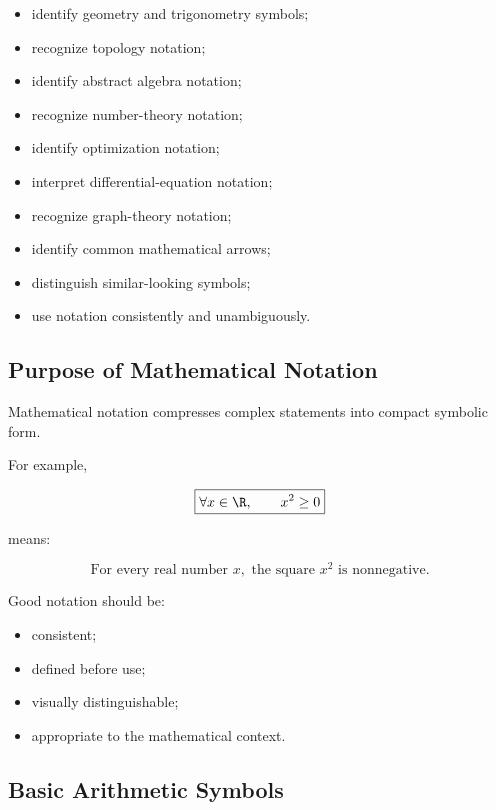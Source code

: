 {\begin{itemize}
    \item identify geometry and trigonometry symbols;
    \item recognize topology notation;
    \item identify abstract algebra notation;
    \item recognize number-theory notation;
    \item identify optimization notation;
    \item interpret differential-equation notation;
    \item recognize graph-theory notation;
    \item identify common mathematical arrows;
    \item distinguish similar-looking symbols;
    \item use notation consistently and unambiguously.
\end{itemize}
}

\subsection{Purpose of Mathematical Notation}
\label{subsec:purpose-mathematical-notation}

Mathematical notation compresses complex statements into compact symbolic
form.

For example,

\[
\boxed{
\forall x\in\R,
\qquad
x^2\geq0
}
\]

means:

\[
\boxed{
\text{For every real number }x,\text{ the square }x^2\text{ is nonnegative.}
}
\]

Good notation should be:

\begin{itemize}
    \item consistent;
    \item defined before use;
    \item visually distinguishable;
    \item appropriate to the mathematical context.
\end{itemize}

\subsection{Basic Arithmetic Symbols}
\label{subsec:basic-arithmetic-symbols}


